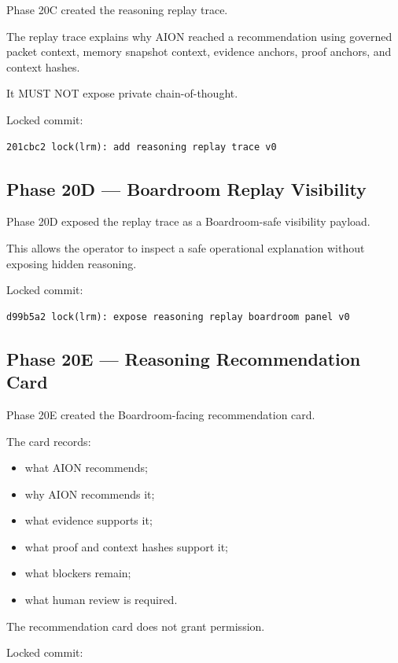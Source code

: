 Phase 20C created the reasoning replay trace.

The replay trace explains why AION reached a recommendation using governed packet context, memory snapshot context, evidence anchors, proof anchors, and context hashes.

It MUST NOT expose private chain-of-thought.

Locked commit:

\begin{verbatim}
201cbc2 lock(lrm): add reasoning replay trace v0
\end{verbatim}

\subsection{Phase 20D --- Boardroom Replay Visibility}

Phase 20D exposed the replay trace as a Boardroom-safe visibility payload.

This allows the operator to inspect a safe operational explanation without exposing hidden reasoning.

Locked commit:

\begin{verbatim}
d99b5a2 lock(lrm): expose reasoning replay boardroom panel v0
\end{verbatim}

\subsection{Phase 20E --- Reasoning Recommendation Card}

Phase 20E created the Boardroom-facing recommendation card.

The card records:

\begin{itemize}
  \item what AION recommends;
  \item why AION recommends it;
  \item what evidence supports it;
  \item what proof and context hashes support it;
  \item what blockers remain;
  \item what human review is required.
\end{itemize}

The recommendation card does not grant permission.

Locked commit:

